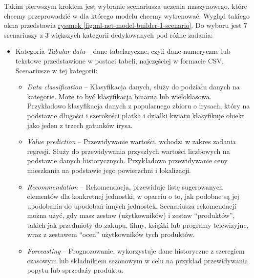 Takim pierwszym krokiem jest wybranie scenariusza uczenia maszynowego, które chcemy przeprowadzić w dla którego modelu chcemy wytrenować.
Wygląd takiego okna przedstawia \hyperref[fig:ml-net-model-builder-1-scenario]{rysunek \ref*{fig:ml-net-model-builder-1-scenario}}.
Do wyboru jest 7 scenariuszy z 3 większych kategorii dedykowanych pod różne zadania:

\begin{itemize}

  \item Kategoria \emph{Tabular data} -- dane tabelaryczne, czyli dane numeryczne lub tekstowe przedstawione w postaci tabeli, najczęściej w formacie CSV.
        Scenariusze w tej kategorii:

        \begin{itemize}

          \item \emph{Data classification} -- Klasyfikacja danych, służy do podziału danych na kategorie.
                Może to być klasyfikacja binarna lub wieloklasowa.
                Przykładowo klasyfikacja danych z popularnego zbioru o irysach, który na podstawie długości i szerokości płatka i działki kwiatu klasyfikuje obiekt jako jeden z trzech gatunków irysa.

          \item \emph{Value prediction} -- Przewidywanie wartości, wchodzi w zakres zadania regresji.
                Służy do przewidywania przyszłych wartości liczbowych na podstawie danych historycznych.
                Przykładowo przewidywanie ceny mieszkania na podstawie jego powierzchni i lokalizacji.

          \item \emph{Recommendation} -- Rekomendacja, przewiduje listę sugerowanych elementów dla konkretnej jednostki, w oparciu o to, jak podobne są jej upodobania do upodobań innych jednostek.
          Scenariusza rekomendacji można użyć, gdy masz zestaw  (użytkowników) i zestaw ``produktów'', takich jak przedmioty do zakupu, filmy, książki lub programy telewizyjne, wraz z zestawem ``ocen'' użytkowników tych produktów.

          \item \emph{Forecasting} -- Prognozowanie, wykorzystuje dane historyczne z szeregiem czasowym lub składnikiem sezonowym w celu na przykład przewidywania popytu lub sprzedaży produktu.

        \end{itemize}


\end{itemize}

